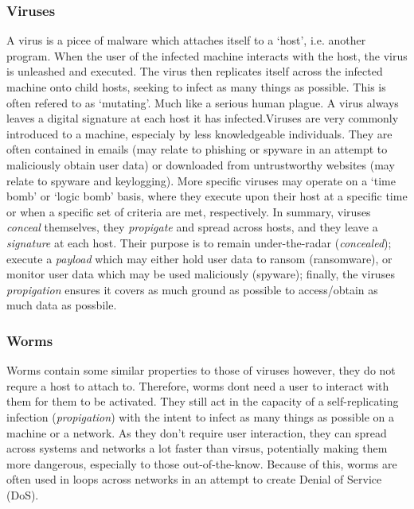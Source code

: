 \documentclass[11pt, english]{article}
\begin{document}
		\subsubsection{Viruses}

	A virus is a picee of malware which attaches itself to a `host', i.e. another program. When the user of the infected machine interacts with the host, the virus is unleashed and executed. The virus then replicates itself across the infected machine onto child hosts, seeking to infect as many things as possible. This is often refered to as `mutating'. Much like a serious human plague. A virus always leaves a digital signature at each host it has infected.Viruses are very commonly introduced to a machine, especialy by less knowledgeable individuals. They are often contained in emails (may relate to phishing or spyware in an attempt to maliciously obtain user data) or downloaded from untrustworthy websites (may relate to spyware and keylogging). More specific viruses may operate on a `time bomb' or `logic bomb' basis, where they execute upon their host at a specific time or when a specific set of criteria are met, respectively. In summary, viruses \textit{conceal} themselves, they \textit{propigate} and spread across hosts, and they leave a \textit{signature} at each host. Their purpose is to remain under-the-radar (\textit{concealed}); execute a \textit{payload} which may either hold user data to ransom (ransomware), or monitor user data which may be used maliciously (spyware); finally, the viruses \textit{propigation} ensures it covers as much ground as possible to access/obtain as much data as possbile.

		\subsubsection{Worms}

	Worms contain some similar properties to those of viruses however, they do not requre a host to attach to. Therefore, worms dont need a user to interact with them for them to be activated. They still act in the capacity of a self-replicating infection (\textit{propigation}) with the intent to infect as many things as possible on a machine or a network. As they don't require user interaction, they can spread across systems and networks a lot faster than virsus, potentially making them more dangerous, especially to those out-of-the-know. Because of this, worms are often used in loops across networks in an attempt to create Denial of Service (DoS).
\end{document}
